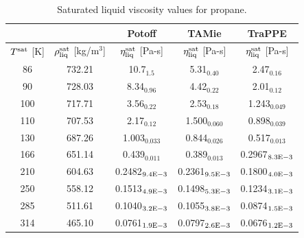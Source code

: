 \documentclass[preprint,review,12pt]{elsarticle}
\begin{document}
	\begin{table}[H]
		\caption{Saturated liquid viscosity values for propane.}
		\begin{center}
			\begin{tabular}{|c|c|c|c|c|}
				\hline
				&                                       & Potoff            & TAMie             & TraPPE            \\ \hline
				$T^{\rm sat}$ {[}K{]} & $\rho^{\rm sat}_{\rm liq}$ [kg/m$^3$] & $\eta_{\rm liq}^{\rm sat}$ {[}Pa-s{]} & $\eta_{\rm liq}^{\rm sat}$ {[}Pa-s{]} & $\eta_{\rm liq}^{\rm sat}$ {[}Pa-s{]} \\ \hline
				86 & 732.21 & 10.7$_{1.5}$      & 5.31$_{0.40}$     & 2.47$_{0.16}$     \\ \hline
				90 & 728.03 & 8.34$_{0.96}$     & 4.42$_{0.22}$     & 2.01$_{0.12}$     \\ \hline
				100  & 717.71 & 3.56$_{0.22}$     & 2.53$_{0.18}$     & 1.243$_{0.049}$   \\ \hline
				110  & 707.53 & 2.17$_{0.12}$     & 1.500$_{0.060}$   & 0.898$_{0.039}$   \\ \hline
				130  & 687.26 & 1.003$_{0.033}$   & 0.844$_{0.026}$   & 0.517$_{0.013}$   \\ \hline
				166  & 651.14 & 0.439$_{0.011}$   & 0.389$_{0.013}$   & 0.2967$_{8.3 \rm E-3}$ \\ \hline
				210  & 604.63 & 0.2482$_{9.4 \rm E-3}$ & 0.2361$_{9.5 \rm E-3}$ & 0.1800$_{4.0 \rm E-3}$ \\ \hline
				250  & 558.12 & 0.1513$_{4.9 \rm E-3}$ & 0.1498$_{5.3 \rm E-3}$ & 0.1234$_{3.1 \rm E-3}$ \\ \hline
				285  & 511.61 & 0.1040$_{3.2 \rm E-3}$ & 0.1055$_{3.8 \rm E-3}$ & 0.0874$_{1.5 \rm E-3}$ \\ \hline
				314  & 465.10 & 0.0761$_{1.9 \rm E-3}$ & 0.0797$_{2.6 \rm E-3}$ & 0.0676$_{1.2 \rm E-3}$ \\ \hline
			\end{tabular}
		\end{center}
	\end{table}
	
\end{document}
